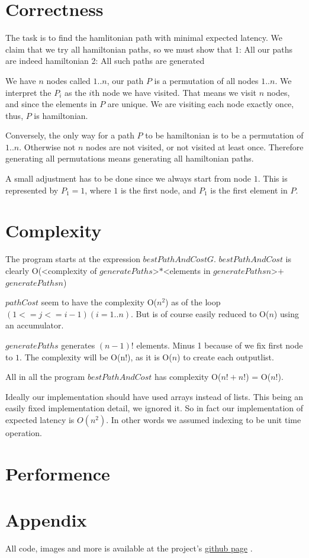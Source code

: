 \documentclass[a4paper,11pt]{article}
\begin{document}
\section{Correctness}
The task is to find the hamlitonian path with minimal expected latency.
We claim that we try all hamiltonian paths, so we must show that
1: All our paths are indeed hamiltonian
2: All such paths are generated

We have $n$ nodes called $1..n$, our path $P$ is a permutation of all nodes $1..n$.
We interpret the $P_i$ as the $i$th node we have visited.
That means we visit $n$ nodes, and since the elements in $P$ are unique.
We are visiting each node exactly once, thus, $P$ is hamiltonian.

Conversely, the only way for a path $P$ to be hamiltonian is to be a permutation of $1..n$.
Otherwise not $n$ nodes are not visited, or not visited at least once.
Therefore generating all permutations means generating all hamiltonian paths.

A small adjustment has to be done since we always start from node $1$.
This is represented by $P_1 = 1$, where $1$ is the first node, and $P_1$ is
the first element in $P$.

\section{Complexity}
The program starts at the expression $bestPathAndCost G$.
$bestPathAndCost$ is clearly
O(<complexity of $generatePaths$>$*$<elements in $generatePaths n$>$+$ $generatePaths n$)

$pathCost$ seem to have the complexity O($n^2$) as of the loop $(1 <= j <= i-1) (i = 1..n)$.
But is of course easily reduced to O($n$) using an accumulator.

$generatePaths$ generates $(n-1)!$ elements. Minus 1 because of we fix first node to $1$. 
The complexity will be O(n!), as it is O($n$) to create each outputlist.

All in all the program $bestPathAndCost$ has complexity O($n!+n!$) = O($n!$).

Ideally our implementation should have used arrays instead of lists.
This being an easily fixed implementation detail, we ignored it.
So in fact our implementation of expected latency is $O(n^2)$.
In other words we assumed indexing to be unit time operation. 

\section{Performence}




\section{Appendix}
All code, images and more is available at the project's \href{https://github.com/bisforboman/Algorithms-TIN092}{github page} .
\end{document}
